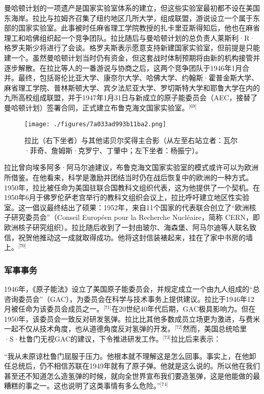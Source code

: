 曼哈顿计划的一项遗产是国家实验室体系的建立，但这些实验室最初都不设在美国东海岸。拉比与拉姆齐召集了纽约地区几所大学，组成联盟，游说设立一个属于东部的国家实验室。此事被时任麻省理工学院教授的扎卡里亚斯得知后，他也在麻省理工和哈佛组织起一个竞争团队。拉比随后与曼哈顿计划的总负责人莱斯利·R·格罗夫斯少将进行了会谈。格罗夫斯表示愿意支持新建国家实验室，但前提是只能建一个。虽然曼哈顿计划当时仍有资金，但这套战时体制预期将由新的机构接管并逐步解散。在拉比等人的一番游说与协商之后，这两个竞争团队于1946年1月合并。最终，包括哥伦比亚大学、康奈尔大学、哈佛大学、约翰斯·霍普金斯大学、麻省理工学院、普林斯顿大学、宾夕法尼亚大学、罗切斯特大学和耶鲁大学在内的九所高校组成联盟，并于1947年1月31日与新成立的原子能委员会（AEC，接替了曼哈顿计划）签署合同，正式建立布鲁克海文国家实验室。\(^\text{[69]}\)
\begin{figure}[ht]
\centering
\texttt{[image: ./figures/7a033ad993b11ba2.png]}
\caption{拉比（右下坐者）与其他诺贝尔奖得主合影（从左至右站立者：瓦尔·菲奇、詹姆斯·克罗宁、丁肇中；左下坐者：杨振宁）。} \label{fig_YXDlb_4}
\end{figure}
拉比曾向埃多阿多·阿马尔迪建议，布鲁克海文国家实验室的模式或许可以为欧洲所借鉴。在他看来，科学是激励并团结当时仍在战后恢复中的欧洲的一种方式。1950年，拉比被任命为美国驻联合国教科文组织代表，这为他提供了一个契机。在1950年6月于佛罗伦萨老宫举行的教科文组织会议上，拉比呼吁建立地区性实验室。这一倡议最终结出了硕果：1952年，来自11个国家的代表联合创立了“欧洲核子研究委员会”（Conseil Européen pour la Recherche Nucléaire，简称 CERN，即欧洲核子研究组织）。拉比随后收到了一封由玻尔、海森堡、阿马尔迪等人联名致信，祝贺他推动这一成就取得成功。他将这封信装裱起来，挂在了家中书房的墙上。\(^\text{[70]}\)
\subsubsection{军事事务}
1946年，《原子能法》设立了美国原子能委员会，并规定成立一个由九人组成的“总咨询委员会”（GAC），为委员会在科学与技术事务上提供建议。拉比于1946年12月被任命为该委员会成员之一。\(^\text{[71]}\)在20世纪40年代后期，GAC极具影响力。但在1950年，该委员会一致反对研发氢弹。拉比比其他多数成员立场更为激进，与费米一起不仅从技术角度，也从道德角度反对氢弹的开发。\(^\text{[72]}\)然而，美国总统哈里·S·杜鲁门无视GAC的建议，下令推进研发工作。\(^\text{[73]}\)拉比后来表示：

“我从未原谅杜鲁门屈服于压力。他根本就不理解这是怎么回事。事实上，在他卸任总统后，仍不相信苏联在1949年就有了原子弹。他就是这么说的。所以他在我们甚至还不知道怎么造氢弹的时候，就向全世界宣布我们要造氢弹，这是他能做的最糟糕的事之一。这也说明了这类事情有多么危险。”\(^\text{[74]}\)

